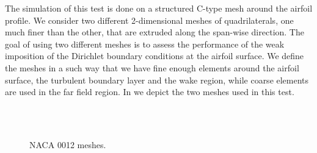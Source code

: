 The simulation of this test is done on a structured C-type mesh around the airfoil profile. We consider two different 2-dimensional meshes of quadrilaterals, one much finer than the other, that are extruded along the span-wise direction. The goal of using two different meshes is to assess the performance of the weak imposition of the Dirichlet boundary conditions at the airfoil surface. We define the meshes in a such way that we have fine enough elements around the airfoil surface, the turbulent boundary layer and the wake region, while coarse elements are used in the far field region. In  we depict the two meshes used in this test.
\begin{figure}[h!]
  \centering
  \\
  \\
  \caption{NACA 0012 meshes.}
  \label{fig-NACA_meshes}
\end{figure}
